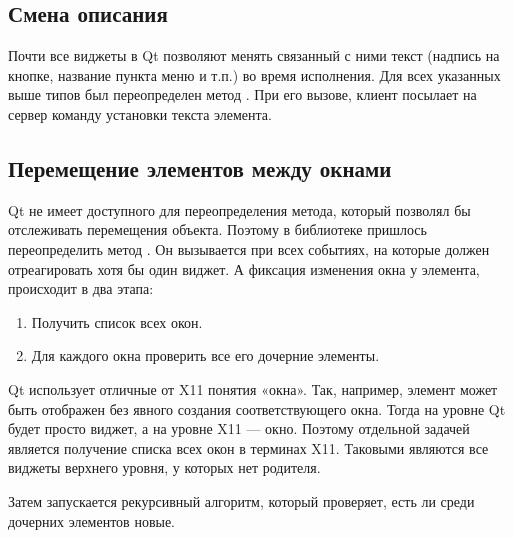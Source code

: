 \subsection{Смена описания}

Почти все виджеты в Qt позволяют менять связанный с ними текст (надпись на
кнопке, название пункта меню и т.п.) во время исполнения. Для всех указанных
выше типов был переопределен метод . При его вызове, клиент
посылает на сервер команду установки текста элемента.

\subsection{Перемещение элементов между окнами}

Qt не имеет доступного для переопределения метода, который позволял бы
отслеживать перемещения объекта. Поэтому в библиотеке пришлось переопределить
метод . Он вызывается при всех событиях, на которые должен
отреагировать хотя бы один виджет. А фиксация изменения окна у элемента,
происходит в два этапа:

\begin{enumerate}
  \item Получить список всех окон.
  \item Для каждого окна проверить все его дочерние элементы.
\end{enumerate}

Qt использует отличные от X11 понятия «окна». Так, например, элемент может быть
отображен без явного создания соответствующего окна. Тогда на уровне Qt будет
просто виджет, а на уровне X11 --- окно. Поэтому отдельной задачей является
получение списка всех окон в терминах X11. Таковыми являются все виджеты
верхнего уровня, у которых нет родителя.

%
%

Затем запускается рекурсивный алгоритм, который проверяет, есть ли среди
дочерних элементов новые.

\begin{algorithm}[H]
\end{algorithm}

